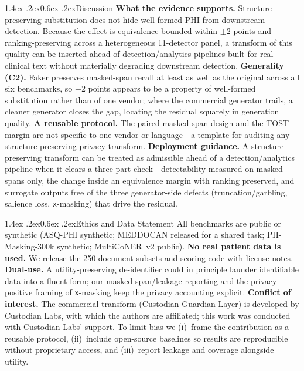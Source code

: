 \documentclass[11pt]{article}
\makeatletter
\renewcommand\section{\@startsection{section}{1}{\z@}%
  {1.4ex \@plus.2ex}{0.6ex \@plus.2ex}{\normalfont\large\bfseries}}
\newcommand{\tp}[1]{\texttt{#1}}
\makeatother
\begin{document}
\section{Discussion}
\textbf{What the evidence supports.} Structure-preserving substitution does not hide well-formed PHI from downstream detection. Because the effect is equivalence-bounded within $\pm2$ points and ranking-preserving across a heterogeneous 11-detector panel, a transform of this quality can be inserted ahead of detection/analytics pipelines built for real clinical text without materially degrading downstream detection. \textbf{Generality (C2).} Faker preserves masked-span recall at least as well as the original across all six benchmarks, so $\pm2$ points appears to be a property of well-formed substitution rather than of one vendor; where the commercial generator trails, a cleaner generator closes the gap, locating the residual squarely in generation quality. \textbf{A reusable protocol.} The paired masked-span design and the TOST margin are not specific to one vendor or language---a template for auditing any structure-preserving privacy transform. \textbf{Deployment guidance.} A structure-preserving transform can be treated as admissible ahead of a detection/analytics pipeline when it clears a three-part check---detectability measured on masked spans only, the change inside an equivalence margin with ranking preserved, and surrogate outputs free of the three generator-side defects (truncation/garbling, salience loss, \tp{x}-masking) that drive the residual.

\section{Ethics and Data Statement}
All benchmarks are public or synthetic (ASQ-PHI synthetic; MEDDOCAN released for a shared task; PII-Masking-300k synthetic; MultiCoNER~v2 public). \textbf{No real patient data is used.} We release the 250-document subsets and scoring code with license notes. \textbf{Dual-use.} A utility-preserving de-identifier could in principle launder identifiable data into a fluent form; our masked-span/leakage reporting and the privacy-positive framing of \tp{x}-masking keep the privacy accounting explicit. \textbf{Conflict of interest.} The commercial transform (Custodian Guardian Layer) is developed by Custodian Labs, with which the authors are affiliated; this work was conducted with Custodian Labs' support. To limit bias we (i)~frame the contribution as a reusable protocol, (ii)~include open-source baselines so results are reproducible without proprietary access, and (iii)~report leakage and coverage alongside utility.
\end{document}
